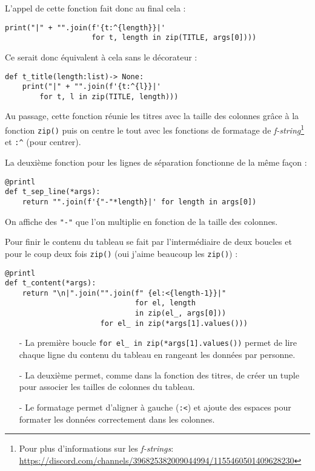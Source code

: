 L'appel de cette fonction fait donc au final cela :
\begin{lstlisting}
print("|" + "".join(f'{t:^{length}}|' 
                    for t, length in zip(TITLE, args[0])))
\end{lstlisting}
\medskip

Ce serait donc équivalent à cela sans le décorateur :
\begin{lstlisting}
def t_title(length:list)-> None:
    print("|" + "".join(f'{t:^{l}}|' 
        for t, l in zip(TITLE, length)))
\end{lstlisting}
\medskip

Au passage, cette fonction réunie les titres avec la taille des colonnes grâce à la fonction \texttt{zip()} puis on centre le tout avec les fonctions de formatage de \textit{f-string}\footnote{Pour plus d'informations sur les \textit{f-strings}: \url{https://discord.com/channels/396825382009044994/1155460501409628230}} et \texttt{:\^} (pour centrer).
\medskip

La deuxième fonction pour les lignes de séparation fonctionne de la même façon :
\begin{lstlisting}
@printl
def t_sep_line(*args):
    return "".join(f'{"-"*length}|' for length in args[0])
\end{lstlisting}
\medskip

On affiche des \texttt{"-"} que l'on multiplie en fonction de la taille des colonnes.
\medskip

Pour finir le contenu du tableau se fait par l'intermédiaire de deux boucles et pour le coup deux fois \texttt{zip()} (oui j'aime beaucoup les \texttt{zip()}) :
\begin{lstlisting}
@printl
def t_content(*args):
    return "\n|".join("".join(f" {el:<{length-1}}|"
                              for el, length
                              in zip(el_, args[0]))
                      for el_ in zip(*args[1].values()))
\end{lstlisting}
\medskip

\begin{itemize}
	\item[-] La première boucle \texttt{for el\_ in zip(*args[1].values())} permet de lire chaque ligne du contenu du tableau en rangeant les données par personne.
	\item[-] La deuxième permet, comme dans la fonction des titres, de créer un tuple pour associer les tailles de colonnes du tableau.
	\item[-] Le formatage permet d'aligner à gauche (\texttt{:<}) et ajoute des espaces pour formater les données correctement dans les colonnes.
\end{itemize}
\medskip

